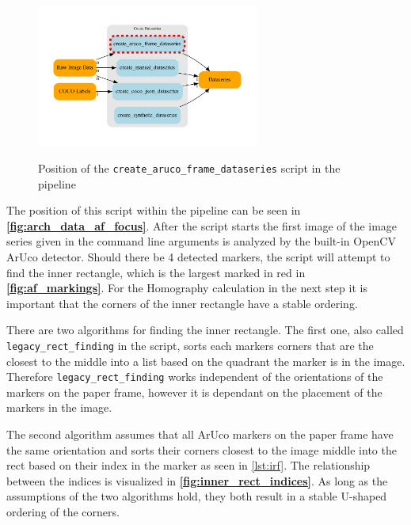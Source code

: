 \documentclass[10pt]{book}
\newcommand{\figureref}[1]{\textbf{\autoref{#1}}}
\begin{document}
\begin{figure}
  \caption{Position of the \texttt{create\_aruco\_frame\_dataseries} script in the pipeline}
  \includegraphics[width=0.65\textwidth]{graph/arch_data_af_focus}
  \label{fig:arch_data_af_focus}
\end{figure}

The position of this script within the pipeline can be seen in \figureref{fig:arch_data_af_focus}. After the script starts the first image of the image series given in the command line arguments is analyzed by the built-in \ac{OpenCV} \ac{ArUco} detector. Should there be 4 detected markers, the script will attempt to find the inner rectangle, which is the largest marked in red in \figureref{fig:af_markings}. For the Homography calculation in the next step it is important that the corners of the inner rectangle have a stable ordering. 

There are two algorithms for finding the inner rectangle. The first one, also called \texttt{legacy\_rect\_finding} in the script, sorts each markers corners that are the closest to the middle into a list based on the quadrant the marker is in the image. Therefore \texttt{legacy\_rect\_finding} works independent of the orientations of the markers on the paper frame, however it is dependant on the placement of the markers in the image. 

The second algorithm assumes that all \ac{ArUco} markers on the paper frame have the same orientation and sorts their corners closest to the image middle into the rect based on their index in the marker as seen in \autoref{lst:irf}. The relationship between the indices is visualized in \figureref{fig:inner_rect_indices}. As long as the assumptions of the two algorithms hold, they both result in a stable U-shaped ordering of the corners.
\end{document}
